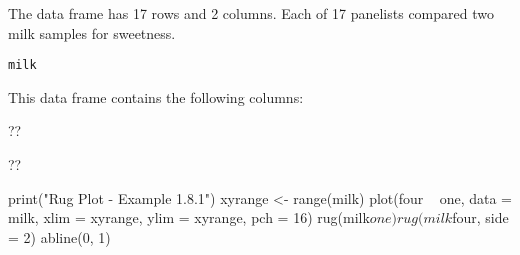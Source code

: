 \begin{Description}\relax
The  data frame has 17 rows and 2 columns.
Each of 17 panelists compared two milk samples
for sweetness.
\end{Description}
\begin{Usage}
\begin{verbatim}milk\end{verbatim}
\end{Usage}
\begin{Format}\relax
This data frame contains the following columns:
\end{Format}
\begin{Source}\relax
??
\end{Source}
\begin{References}\relax
??
\end{References}
\begin{Examples}
\begin{ExampleCode}
print("Rug Plot - Example 1.8.1")
xyrange <- range(milk)
plot(four ~ one, data = milk, xlim = xyrange, ylim = xyrange, pch = 16)
rug(milk$one)
rug(milk$four, side = 2)
abline(0, 1)
\end{ExampleCode}
\end{Examples}

